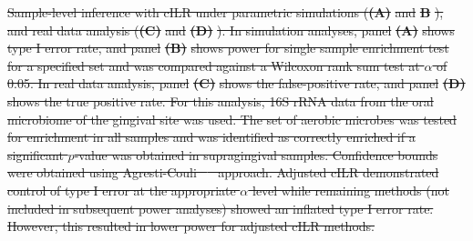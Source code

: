 \documentclass[10pt,letterpaper]{article}
\providecommand{\DIFdeltex}[1]{{\protect\color{red}\sout{#1}}}                      %
\providecommand{\DIFdelbegin}{} %
\providecommand{\DIFdelFL}[1]{\DIFdel{#1}} %
\providecommand{\DIFdel}[1]{\texorpdfstring{\DIFdeltex{#1}}{}} %
\newcommand{\DIFscaledelfig}{0.5}
\newlength{\DIFdelgraphicswidth} %
\newlength{\DIFdelgraphicsheight} %
\newcommand{\DIFdelincludegraphics}[2][]{%
\sbox{\DIFdelgraphicsbox}{\DIFOincludegraphics[#1]{#2}}%
\settoboxwidth{\DIFdelgraphicswidth}{\DIFdelgraphicsbox} %
\settoboxtotalheight{\DIFdelgraphicsheight}{\DIFdelgraphicsbox} %
\scalebox{\DIFscaledelfig}{%
\parbox[b]{\DIFdelgraphicswidth}{\usebox{\DIFdelgraphicsbox}\\[-\baselineskip] \rule{\DIFdelgraphicswidth}{0em}}\llap{\resizebox{\DIFdelgraphicswidth}{\DIFdelgraphicsheight}{%
\setlength{\unitlength}{\DIFdelgraphicswidth}%
\begin{picture}(1,1)%
\thicklines\linethickness{2pt} %
{\color[rgb]{1,0,0}\put(0,0){\framebox(1,1){}}}%
{\color[rgb]{1,0,0}\put(0,0){\line( 1,1){1}}}%
{\color[rgb]{1,0,0}\put(0,1){\line(1,-1){1}}}%
\end{picture}%
}\hspace*{3pt}}} %
} %
\DeclareRobustCommand{\DIFdelbegin}{\DIFOdelbegin \let\includegraphics\DIFdelincludegraphics} %
\begin{document}
\DIFdelbegin %
{%
\DIFdelFL{Sample-level inference with cILR under parametric simulations (}\textbf{\DIFdelFL{(A)}} %
\DIFdelFL{and }\textbf{\DIFdelFL{B}}%
\DIFdelFL{), and real data analysis (}\textbf{\DIFdelFL{(C)}} %
\DIFdelFL{and }\textbf{\DIFdelFL{(D)}}%
\DIFdelFL{). In simulation analyses, panel }\textbf{\DIFdelFL{(A)}} %
\DIFdelFL{shows type I error rate, and panel }\textbf{\DIFdelFL{(B)}} %
\DIFdelFL{shows power for single sample enrichment test for a specified set and was compared against a Wilcoxon rank sum test at $\alpha$ of 0.05. In real data analysis, panel }\textbf{\DIFdelFL{(C)}} %
\DIFdelFL{shows the false-positive rate, and panel }\textbf{\DIFdelFL{(D)}} %
\DIFdelFL{shows the true positive rate. For this analysis, 16S rRNA data from the oral microbiome of the gingival site was used. The set of aerobic microbes was tested for enrichment in all samples and was identified as correctly enriched if a significant $p$-value was obtained in supragingival samples. Confidence bounds were obtained using Agresti-Couli \mbox{%
\cite{agresti1998} }\hspace{0pt}%
approach. Adjusted cILR demonstrated control of type I error at the appropriate $\alpha$ level while remaining methods (not included in subsequent power analyses) showed an inflated type I error rate. However, this resulted in lower power for adjusted cILR methods.}}
\end{document}
